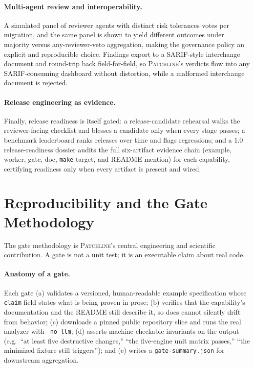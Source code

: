 \documentclass[11pt]{article}
\newcommand{\tool}{\textsc{Patchline}}
\newcommand{\code}[1]{\texttt{#1}}
\begin{document}
\paragraph{Multi-agent review and interoperability.} A simulated panel of reviewer agents with
distinct risk tolerances votes per migration, and the same panel is shown to yield different outcomes
under majority versus any-reviewer-veto aggregation, making the governance policy an explicit and
reproducible choice. Findings export to a SARIF-style interchange document and round-trip back
field-for-field, so \tool{}'s verdicts flow into any SARIF-consuming dashboard without distortion,
while a malformed interchange document is rejected.

\paragraph{Release engineering as evidence.} Finally, release readiness is itself gated: a
release-candidate rehearsal walks the reviewer-facing checklist and blesses a candidate only when
every stage passes; a benchmark leaderboard ranks releases over time and flags regressions; and a
1.0 release-readiness dossier audits the full six-artifact evidence chain (example, worker, gate, doc,
\code{make} target, and README mention) for each capability, certifying readiness only when every
artifact is present and wired.

\section{Reproducibility and the Gate Methodology}
\label{sec:repro}

The gate methodology is \tool's central engineering and scientific contribution. A gate is not a unit
test; it is an executable claim about real code.

\paragraph{Anatomy of a gate.} Each gate (a) validates a versioned, human-readable example
specification whose \code{claim} field states what is being proven in prose; (b) verifies that the
capability's documentation and the README still describe it, so docs cannot silently drift from
behavior; (c) downloads a pinned public repository slice and runs the real analyzer with
\code{--no-llm}; (d) asserts machine-checkable invariants on the output (e.g.\ ``at least five
destructive changes,'' ``the five-engine unit matrix passes,'' ``the minimized fixture still
triggers''); and (e) writes a \code{gate-summary.json} for downstream aggregation.
\end{document}
